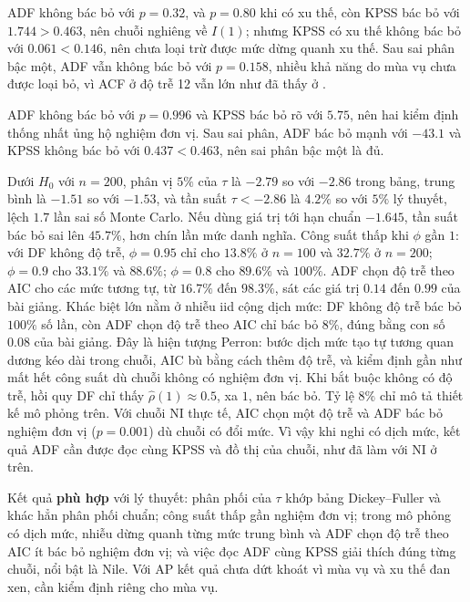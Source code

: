  ADF không bác bỏ với $p=0.32$, và $p=0.80$ khi có xu thế, còn KPSS bác bỏ với $1.744>0.463$, nên chuỗi nghiêng về $I(1)$; nhưng KPSS có xu thế không bác bỏ với $0.061<0.146$, nên chưa loại trừ được mức dừng quanh xu thế. Sau sai phân bậc một, ADF vẫn không bác bỏ với $p=0.158$, nhiều khả năng do mùa vụ chưa được loại bỏ, vì ACF ở độ trễ 12 vẫn lớn như đã thấy ở .

 ADF không bác bỏ với $p=0.996$ và KPSS bác bỏ rõ với $5.75$, nên hai kiểm định thống nhất ủng hộ nghiệm đơn vị. Sau sai phân, ADF bác bỏ mạnh với $-43.1$ và KPSS không bác bỏ với $0.437<0.463$, nên sai phân bậc một là đủ.

 Dưới $H_0$ với $n=200$, phân vị $5\%$ của $\tau$ là $-2.79$ so với $-2.86$ trong bảng, trung bình là $-1.51$ so với $-1.53$, và tần suất $\tau<-2.86$ là $4.2\%$ so với $5\%$ lý thuyết, lệch $1.7$ lần sai số Monte Carlo. Nếu dùng giá trị tới hạn chuẩn $-1.645$, tần suất bác bỏ sai lên $45.7\%$, hơn chín lần mức danh nghĩa. Công suất thấp khi $\phi$ gần $1$: với DF không độ trễ, $\phi=0.95$ chỉ cho $13.8\%$ ở $n=100$ và $32.7\%$ ở $n=200$; $\phi=0.9$ cho $33.1\%$ và $88.6\%$; $\phi=0.8$ cho $89.6\%$ và $100\%$. ADF chọn độ trễ theo AIC cho các mức tương tự, từ $16.7\%$ đến $98.3\%$, sát các giá trị $0.14$ đến $0.99$ của bài giảng. Khác biệt lớn nằm ở nhiễu iid cộng dịch mức: DF không độ trễ bác bỏ $100\%$ số lần, còn ADF chọn độ trễ theo AIC chỉ bác bỏ $8\%$, đúng bằng con số $0.08$ của bài giảng. Đây là hiện tượng Perron: bước dịch mức tạo tự tương quan dương kéo dài trong chuỗi, AIC bù bằng cách thêm độ trễ, và kiểm định gần như mất hết công suất dù chuỗi không có nghiệm đơn vị. Khi bắt buộc không có độ trễ, hồi quy DF chỉ thấy $\hat\rho(1)\approx0.5$, xa $1$, nên bác bỏ. Tỷ lệ $8\%$ chỉ mô tả thiết kế mô phỏng trên. Với chuỗi NI thực tế, AIC chọn một độ trễ và ADF bác bỏ nghiệm đơn vị ($p=0.001$) dù chuỗi có đổi mức. Vì vậy khi nghi có dịch mức, kết quả ADF cần được đọc cùng KPSS và đồ thị của chuỗi, như đã làm với NI ở trên.

 Kết quả \textbf{phù hợp} với lý thuyết: phân phối của $\tau$ khớp bảng Dickey--Fuller và khác hẳn phân phối chuẩn; công suất thấp gần nghiệm đơn vị; trong mô phỏng có dịch mức, nhiễu dừng quanh từng mức trung bình và ADF chọn độ trễ theo AIC ít bác bỏ nghiệm đơn vị; và việc đọc ADF cùng KPSS giải thích đúng từng chuỗi, nổi bật là Nile. Với AP kết quả chưa dứt khoát vì mùa vụ và xu thế đan xen, cần kiểm định riêng cho mùa vụ.
